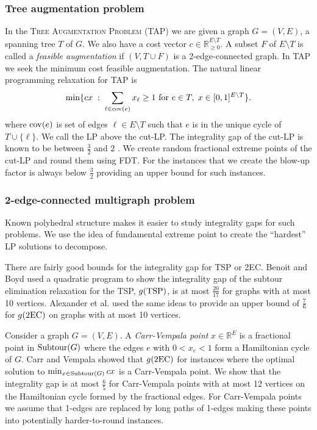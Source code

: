 \subsubsection{Tree augmentation problem}
In the \textsc{Tree Augmentation Problem (TAP)} we are given a  graph $G=(V,E)$, a spanning tree $T$ of $G$. We also have a cost vector $c\in \mathbb{R}^{E\setminus T}_{\geq 0}$. A subset $F$ of $E\setminus T$ is called a \textit{feasible augmentation} if $(V,T\cup F)$ is a 2-edge-connected graph. In TAP we seek the minimum cost feasible augmentation. The natural linear programming relaxation for TAP is 
\begin{equation}
\min \{cx\; : \; \sum_{\ell \in \mathrm{cov}(e)} x_{\ell} \geq 1 \text{ for } e\in T, \; x\in [0,1]^{E\setminus T}\}.
\end{equation}
where $\mathrm{cov}(e)$ is set of edges $\ell \in E\setminus T$ such that $e$ is in the unique cycle of $T\cup \{\ell\}$. We call the LP above the cut-LP. The integrality gap of the cut-LP is known to be between $\frac{3}{2}$ \cite{32gaptap} and $2$ \cite{FJ81}. We create random fractional extreme points of the cut-LP and round them using FDT. For the instances that we create the blow-up factor is always below $\frac{3}{2}$ providing an upper bound for such instances.

\subsubsection{2-edge-connected multigraph problem}
Known polyhedral structure makes it easier to study integrality gaps for such problems. We use the idea of fundamental extreme point \cite{carrravi,boydcarr,Carr2004} to create the ``hardest'' LP solutions to decompose.


There are fairly good bounds for the integrality gap for TSP or 2EC. Benoit and Boyd \cite{TSPcompute} used a quadratic program to show the integrality gap of the subtour elimination relaxation for the TSP, $g(\operatorname{{{TSP}}})$, is at most $\frac{20}{17}$ for graphs with at most 10 vertices. Alexander et al. \cite{alexander2006integrality} used the same ideas to provide an upper bound of $\frac{7}{6}$ for $g(\2ec)$ on graphs with at most 10 vertices. 

Consider a graph $G=(V,E)$. A \textit{Carr-Vempala point} $x\in \mathbb{R}^E$ is a fractional point in $\operatorname{{Subtour}}(G)$ where the edges $e$ with $0<x_e<1$ form a Hamiltonian cycle of $G$.  Carr and Vempala \cite{Carr2004} showed that $g(\2ec)$ for instances where the optimal solution to $\min_{x\in \operatorname{{Subtour}}(G)}cx$ is a Carr-Vempala point. We show that the integrality gap is at most $\frac{6}{5}$ for Carr-Vempala points with at most 12 vertices on the Hamiltonian cycle formed by the fractional edges. For Carr-Vempala points we assume that 1-edges are replaced by long paths of 1-edges making these points into potentially harder-to-round instances.





